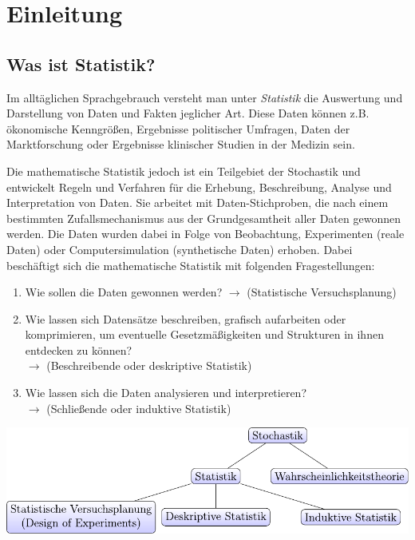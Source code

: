 \chapter{Einleitung}
\section{Was ist Statistik?}
Im alltäglichen Sprachgebrauch versteht man unter \emph{Statistik} die
Auswertung und Darstellung von Daten und Fakten jeglicher Art. Diese Daten
können z.B. ökonomische Kenngrößen, Ergebnisse politischer Umfragen, Daten der
Marktforschung oder Ergebnisse klinischer Studien in der Medizin sein.

Die mathematische Statistik jedoch ist ein Teilgebiet der Stochastik und
entwickelt Regeln und Verfahren für die Erhebung, Beschreibung, Analyse und
Interpretation von Daten. Sie arbeitet mit Daten-Stichproben, die nach einem
bestimmten Zufallsmechanismus aus der Grundgesamtheit aller Daten gewonnen
werden. Die Daten wurden dabei in Folge von Beobachtung, Experimenten (reale
Daten) oder Computersimulation (synthetische Daten) erhoben. Dabei beschäftigt
sich die mathematische Statistik mit folgenden Fragestellungen:
\begin{enumerate}
\item Wie sollen die Daten gewonnen werden?
  $\rightarrow$ (Statistische Versuchsplanung)
\item  Wie lassen sich Datensätze beschreiben, grafisch aufarbeiten oder
  komprimieren, um eventuelle Gesetzmäßigkeiten und Strukturen in ihnen
  entdecken zu können? \\
  $\rightarrow$ (Beschreibende oder deskriptive Statistik)
\item Wie lassen sich die Daten analysieren und interpretieren? \\
  $\rightarrow$ (Schließende oder induktive Statistik)
\end{enumerate}

\begin{center}
  \includegraphics{img/stat_gruppen}
\end{center}

